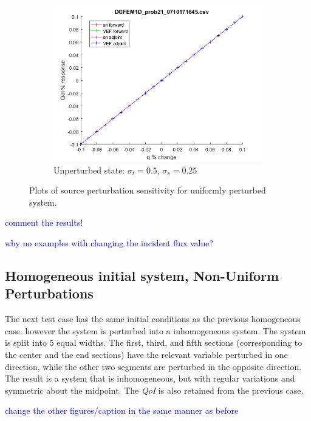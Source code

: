 \documentclass{article}
\newcommand{\sigt}{\sigma_t}
\newcommand{\sigs}{\sigma_s}
\newcommand{\qoi}{{\it QoI}\xspace}
\newcommand{\comment}[2]{\marginpar{\textcolor{#2}{$\star$}}\textcolor{#2}{#1}\newline}
\newcommand{\jcr}[1]{\comment{#1}{blue}}
\newcommand{\jcr}[1]{\phantom{a}}
\begin{document}
\begin{figure}[H]
\begin{subfigure}{.65\textwidth}
  \centering
  \includegraphics[width=.98\linewidth]{figures/21qSens.png}
  \caption{Unperturbed state: $\sigt=0.5$, $\sigs=0.25$}
  \label{fig:sfig3}
\end{subfigure}
\caption{Plots of source perturbation sensitivity for uniformly perturbed system.}
\label{fig:fig}
\end{figure}

\jcr{comment the results!}

\jcr{why no examples with changing the incident flux value?}

\subsection{Homogeneous initial system, Non-Uniform Perturbations}

The next test case has the same initial conditions as the previous homogeneous case. however the system is perturbed into a inhomogeneous system. The system is split into 5 equal widths. The first, third, and fifth sections (corresponding to the center and the end sections) have the relevant variable perturbed in one direction, while the other two segments are perturbed in the opposite direction. The result is a system that is inhomogeneous, but with regular variations and symmetric about the midpoint. The \qoi is also retained from the previous case.

\jcr{change the other figures/caption in the same manner as before}
\end{document}
